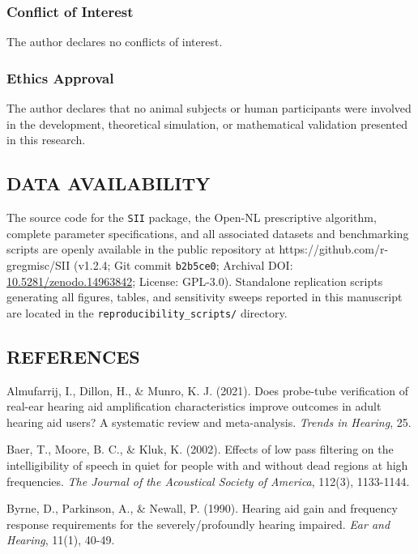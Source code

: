\documentclass[
  12pt,
]{article}
\begin{document}
\subsubsection{Conflict of Interest}\label{conflict-of-interest}

The author declares no conflicts of interest.

\subsubsection{Ethics Approval}\label{ethics-approval}

The author declares that no animal subjects or human participants were
involved in the development, theoretical simulation, or mathematical
validation presented in this research.

\subsection{DATA AVAILABILITY}\label{data-availability}

The source code for the \texttt{SII} package, the Open-NL prescriptive
algorithm, complete parameter specifications, and all associated
datasets and benchmarking scripts are openly available in the public
repository at https://github.com/r-gregmisc/SII (v1.2.4; Git commit
\texttt{b2b5ce0}; Archival DOI:
\href{https://doi.org/10.5281/zenodo.14963842}{10.5281/zenodo.14963842};
License: GPL-3.0). Standalone replication scripts generating all
figures, tables, and sensitivity sweeps reported in this manuscript are
located in the \texttt{reproducibility\_scripts/} directory.

\subsection{REFERENCES}\label{references}

Almufarrij, I., Dillon, H., \& Munro, K. J. (2021). Does probe-tube
verification of real-ear hearing aid amplification characteristics
improve outcomes in adult hearing aid users? A systematic review and
meta-analysis. \emph{Trends in Hearing}, 25.

Baer, T., Moore, B. C., \& Kluk, K. (2002). Effects of low pass
filtering on the intelligibility of speech in quiet for people with and
without dead regions at high frequencies. \emph{The Journal of the
Acoustical Society of America}, 112(3), 1133-1144.

Byrne, D., Parkinson, A., \& Newall, P. (1990). Hearing aid gain and
frequency response requirements for the severely/profoundly hearing
impaired. \emph{Ear and Hearing}, 11(1), 40-49.
\end{document}
